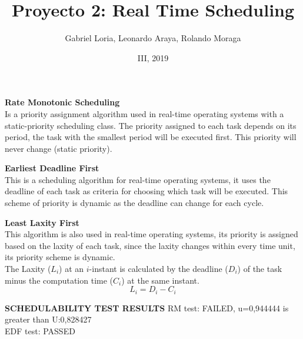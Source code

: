 \documentclass{beamer}
\author{Gabriel Loria, Leonardo Araya, Rolando Moraga}
\institute{ITCR, Maestría en Ingeniería en electr\'onica \\ Dise\~no de Sistemas en Tiempo Real}
\date{III, 2019}
\title{Proyecto 2: Real Time Scheduling}
\begin{document}
\begin{frame}
\titlepage
\end{frame}
\begin{frame}
\textbf{Rate Monotonic Scheduling} \\ Is a priority assignment algorithm used in real-time operating systems with a static-priority scheduling class. The priority assigned to each task depends on its period, the task with the smallest period will be executed first. This priority will never change (static priority).
\end{frame}

\begin{frame}
\textbf{Earliest Deadline First} \\ This is a scheduling algorithm for real-time operating systems, it uses the deadline of each task as criteria for choosing which task will be executed. This scheme of priority is dynamic as the deadline can change for each cycle.
\end{frame}

\begin{frame}
\textbf{Least Laxity First} \\ This algorithm is also used in real-time operating systems, its priority is assigned based on the laxity of each task, since the laxity changes within every time unit, its priority scheme is dynamic. \\ The Laxity ($L_i$) at an $i$-instant is calculated by the deadline ($D_i$) of the task minus the computation time ($C_i$) at the same instant. \[L_i = D_i - C_i\]
\end{frame}





\begin{frame}
\textbf{SCHEDULABILITY TEST RESULTS} 
\newline  RM test: FAILED, u=0,944444 is greater than U:0,828427 \\ 
EDF test: PASSED  
\end{frame}
\end{document}
